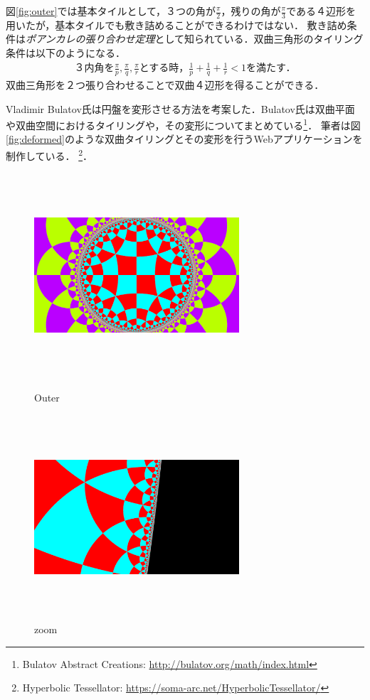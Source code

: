 図\ref{fig:outer}では基本タイルとして，３つの角が$\frac{\pi}{2}$，残りの角が$\frac{\pi}{3}$である４辺形を用いたが，基本タイルでも敷き詰めることができるわけではない．
敷き詰め条件は\emph{ポアンカレの張り合わせ定理}として知られている．双曲三角形のタイリング条件は以下のようになる．
\begin{eqnarray*}
\text{３内角を}\frac{\pi}{p},\frac{\pi}{q},\frac{\pi}{r}\text{とする時，}
 \frac{1}{p} + \frac{1}{q} + \frac{1}{r} < 1 \text{を満たす．}
\end{eqnarray*}
双曲三角形を２つ張り合わせることで双曲４辺形を得ることができる．

Vladimir Bulatov氏は円盤を変形させる方法を考案した\cite{bending}．Bulatov氏は双曲平面や双曲空間におけるタイリングや，その変形についてまとめている\footnote{Bulatov Abstract Creations: \url{http://bulatov.org/math/index.html}}．
筆者は図\ref{fig:deformed}のような双曲タイリングとその変形を行うWebアプリケーションを制作している．
\footnote{Hyperbolic Tessellator: \url{https://soma-arc.net/HyperbolicTessellator/}}．

\begin{figure}[htbp]
  \begin{minipage}{0.49\hsize}
   \center
   \includegraphics[width=3in, height=3in, keepaspectratio]{../img/tessellation/outer.pdf}
   \caption{Outer}
   \label{fig:Outer}
  \end{minipage}
 \hspace*{\fill}
 \begin{minipage}{0.49\hsize}
  \center
  \includegraphics[width=3in, height=3in, keepaspectratio]{../img/tessellation/zoom.pdf}
  \caption{zoom}
  \label{fig:zoom}
 \end{minipage}
\end{figure}


